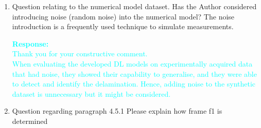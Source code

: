 \documentclass[11pt,a2paper]{report}
\begin{document}
{\begin{enumerate}
		\textcolor{Cyan}{
			\textbf{Response:} \\
			Thank you for your constructive comment. \\
			The overfitting problem in model selection can, in my opinion, be partially solved using the K-folds cross-validation technique.
			It is important to note that this technique was only used in conjunction with the one-to-one RMS-based approach (FCN models for delamination identification).
			The results of applying the K-folds technique compared to when it is not applied are shown in Figure 5.8, which presents a comparison of the experimental cases by using the adaptive wavenumber filtering method [44, 47], FCN-DenseNet [164], and FCN-DenseNet [167].
			Figure 5.8 (c) shows the predicted output of FCN-DenseNet without applying the K-folds technique, as presented in [164], while Fig. 5.8 (d) shows the predicted output when the K-folds technique is applied, as presented in [167].
			I can confirm that applying the K-folds technique improved the prediction performance and the generalization capability of the same implemented model based on the results of both approaches (with and without K-folds).
		}
		
		\item Question relating to the numerical model dataset. 
		Has the Author considered introducing noise (random noise) into the numerical model? The noise introduction is a frequently used technique to simulate measurements.
		
		\textcolor{Cyan}{
			\textbf{Response:} \\
			Thank you for your constructive comment. \\
			When evaluating the developed DL models on experimentally acquired data that had noise, they showed their capability to generalise, and they were able to detect and identify the delamination.
			Hence, adding noise to the synthetic dataset is unnecessary but it might be considered.	
		}
		
		\item Question regarding paragraph 4.5.1 Please explain how frame f1 is
		determined
		

\end{enumerate}}
\end{document}
